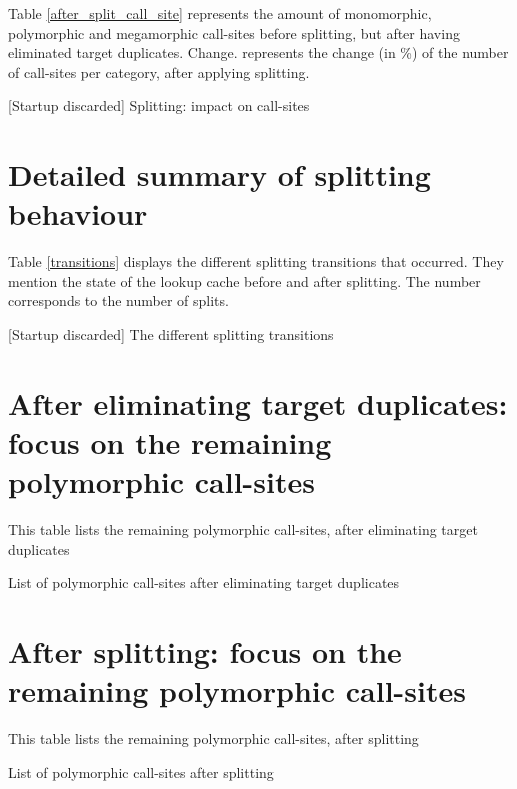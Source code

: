 \documentclass[preprint]{acmart}
\let\NoStartupBeforeAfterSplitSites\BeforeAfterSplitSites
\let\NoStartupSplittingTransitions\SplittingTransitions
\begin{document}
Table \ref{after_split_call_site} represents the amount of monomorphic, polymorphic and megamorphic call-sites before splitting, but after having eliminated target duplicates.
Change. represents the change (in \%) of the number of call-sites per category, after applying splitting.

\begin{table}[h!]
	\centering
	\NoStartupBeforeAfterSplitSites
	\caption{[Startup discarded] Splitting: impact on call-sites}
	\label{after_split_call_site}
\end{table}

\section{Detailed summary of splitting behaviour}

Table \ref{transitions} displays the different splitting transitions that occurred. They mention the state of the lookup cache before and after splitting. The number corresponds to the number of splits.

\begin{table}[h!]
	\centering
	\NoStartupSplittingTransitions
	\caption{[Startup discarded] The different splitting transitions}
	\label{transitions}
\end{table}


\clearpage
\appendix
\section{After eliminating target duplicates: focus on the remaining polymorphic call-sites}
\label{aftertp}

This table lists the remaining polymorphic call-sites, after eliminating target duplicates

\begin{table}[h!]
	\centering
	\resizebox{\linewidth}{!}{
	\PolyAfterTP
	}
	\caption{List of polymorphic call-sites after eliminating target duplicates}
\end{table}


\section{After splitting: focus on the remaining polymorphic call-sites}
\label{aftersplitting}

This table lists the remaining polymorphic call-sites, after splitting

\begin{table}[h!]
	\centering
	\resizebox{\linewidth}{!}{
	\PolyAfterSplitting
	}
	\caption{List of polymorphic call-sites after splitting}
\end{table}
\end{document}
